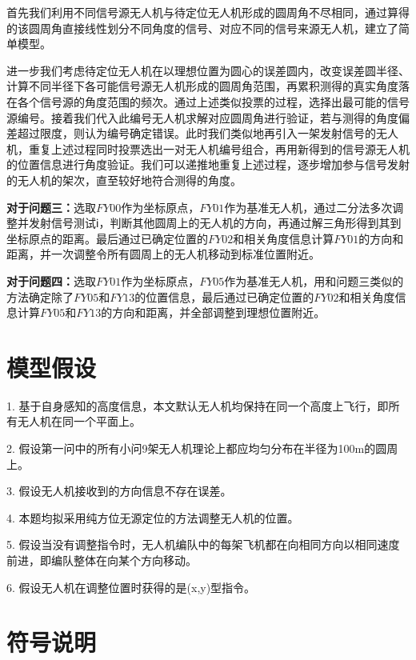 \documentclass{ctexart}
\begin{document}
首先我们利用不同信号源无人机与待定位无人机形成的圆周角不尽相同，通过算得的该圆周角直接线性划分不同角度的信号、对应不同的信号来源无人机，建立了简单模型。

进一步我们考虑待定位无人机在以理想位置为圆心的误差圆内，改变误差圆半径、计算不同半径下各可能信号源无人机形成的圆周角范围，再累积测得的真实角度落在各个信号源的角度范围的频次。通过上述类似投票的过程，选择出最可能的信号源编号。接着我们代入此编号无人机求解对应圆周角进行验证，若与测得的角度偏差超过限度，则认为编号确定错误。此时我们类似地再引入一架发射信号的无人机，重复上述过程同时投票选出一对无人机编号组合，再用新得到的信号源无人机的位置信息进行角度验证。我们可以递推地重复上述过程，逐步增加参与信号发射的无人机的架次，直至较好地符合测得的角度。

\textbf{对于问题三：}选取$FY00$作为坐标原点，$FY01$作为基准无人机，通过二分法多次调整并发射信号测试ℹ，判断其他圆周上的无人机的方向，再通过解三角形得到其到坐标原点的距离。最后通过已确定位置的$FY02$和相关角度信息计算$FY01$的方向和距离，并一次调整令所有圆周上的无人机移动到标准位置附近。
    
\textbf{对于问题四：}选取$FY01$作为坐标原点，$FY05$作为基准无人机，用和问题三类似的方法确定除了$FY05$和$FY13$的位置信息，最后通过已确定位置的$FY02$和相关角度信息计算$FY05$和$FY13$的方向和距离，并全部调整到理想位置附近。


\section{模型假设}
1. \quad 基于自身感知的高度信息，本文默认无人机均保持在同一个高度上飞行，即所有无人机在同一个平面上。

2. \quad 假设第一问中的所有小问9架无人机理论上都应均匀分布在半径为100m的圆周上。

3. \quad 假设无人机接收到的方向信息不存在误差。

4. \quad 本题均拟采用纯方位无源定位的方法调整无人机的位置。

5. \quad 假设当没有调整指令时，无人机编队中的每架飞机都在向相同方向以相同速度前进，即编队整体在向某个方向移动。

6. \quad 假设无人机在调整位置时获得的是(x,y)型指令。

\section{符号说明}
\end{document}
